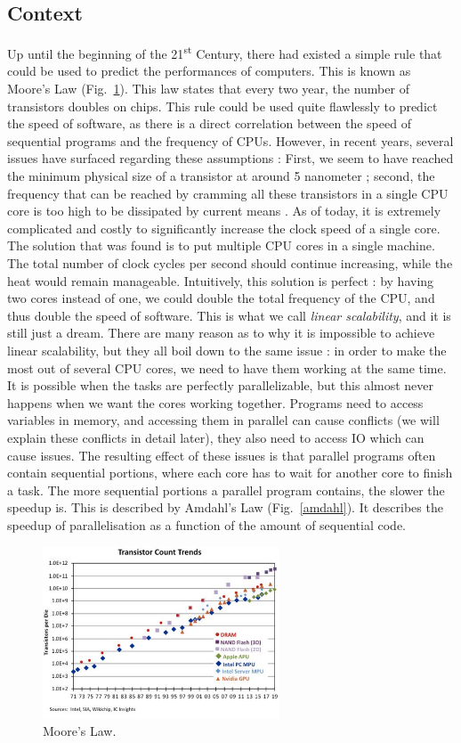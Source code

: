\documentclass[conference]{IEEEtran}
\begin{document}
\subsection{Context}
Up until the beginning of the 21\textsuperscript{st} Century, there had existed a simple rule that could be used to predict the performances of computers. This is known as Moore's Law (Fig.~\ref{moore}). This law states that every two year, the number of transistors doubles on chips. This rule could be used quite flawlessly to predict the speed of software, as there is a direct correlation between the speed of sequential programs and the frequency of CPUs. However, in recent years, several issues have surfaced regarding these assumptions : First, we seem to have reached the minimum physical size of a transistor at around 5 nanometer ; second, the frequency that can be reached by cramming all these transistors in a single CPU core is too high to be dissipated by current means \cite{moore}. As of today, it is extremely complicated and costly to significantly increase the clock speed of a single core. The solution that was found is to put multiple CPU cores in a single machine. The total number of clock cycles per second should continue increasing, while the heat would remain manageable. Intuitively, this solution is perfect : by having two cores instead of one, we could double the total frequency of the CPU, and thus double the speed of software. This is what we call \textit{linear scalability}, and it is still just a dream. There are many reason as to why it is impossible to achieve linear scalability, but they all boil down to the same issue : in order to make the most out of several CPU cores, we need to have them working at the same time. It is possible when the tasks are perfectly parallelizable, but this almost never happens when we want the cores working together. Programs need to access variables in memory, and accessing them in parallel can cause conflicts (we will explain these conflicts in detail later), they also need to access IO which can cause issues. The resulting effect of these issues is that parallel programs often contain sequential portions, where each core has to wait for another core to finish a task. The more sequential portions a parallel program contains, the slower the speedup is. This is described by Amdahl's Law \cite{amdahl} (Fig.~\ref{amdahl}). It describes the speedup of parallelisation as a function of the amount of sequential code.

\begin{figure}[!ht]
\centerline{\includegraphics[width=70mm]{moore.jpg}}
\caption{Moore's Law.}\label{moore}
\end{figure}
\end{document}
